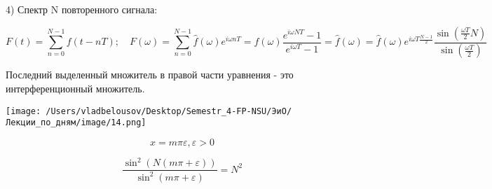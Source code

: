 \documentclass[12pt, a4paper]{report}
\begin{document}
4) Спектр N повторенного сигнала: 

\[ F(t)= \sum_{n=0}^{N-1} f( t - nT); \quad F(\omega)= \sum _{n=0}^{N-1} \hat{f}(\omega) e^{i \omega n T} = f( \omega ) \frac{ e ^{i \omega NT} -1}{e ^{i \omega T} -1}  = \hat{f} ( \omega )= \hat{f}(\omega) e^{i \omega T \frac{ N-1 }{2} } \boxed{\frac{\sin \left( \frac{\omega T}{2}N  \right) }{\sin \left( \frac{\omega T}{2} \right)}}   \]

Последний выделенный  множитель в правой части уравнения - это интерференционный множитель.

\begin{center}
    \texttt{[image: /Users/vladbelousov/Desktop/Semestr\_4-FP-NSU/ЭиО/Лекции\_по\_дням/image/14.png]}
\end{center}
\[ x=  m \pi \varepsilon, \varepsilon > 0  \] 

\[ \frac{\sin ^2 (N ( m\pi+ \varepsilon))}{\sin  ^2 ( m \pi + \varepsilon )} = N ^2   \] 


\ifdefined\mainfile
\else
    
\end{document}

